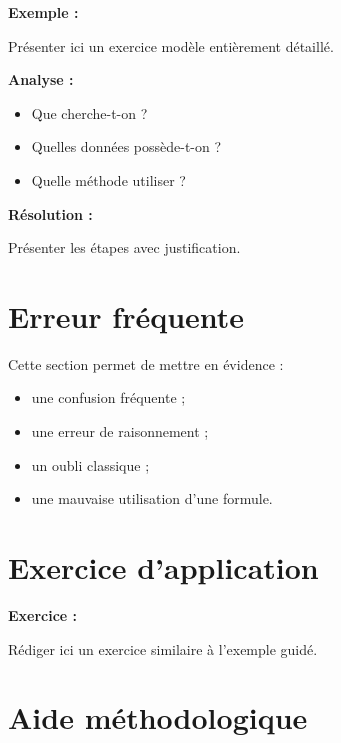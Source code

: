 \documentclass[11pt,a4paper]{article}
\begin{document}
\begin{cadreexemple}
\textbf{Exemple :}

\medskip

Présenter ici un exercice modèle entièrement détaillé.

\medskip

\textbf{Analyse :}
\begin{itemize}
    \item Que cherche-t-on ?
    \item Quelles données possède-t-on ?
    \item Quelle méthode utiliser ?
\end{itemize}

\medskip

\textbf{Résolution :}

Présenter les étapes avec justification.
\end{cadreexemple}

\section{Erreur fréquente}

\begin{cadreattention}
Cette section permet de mettre en évidence :
\begin{itemize}
    \item une confusion fréquente ;
    \item une erreur de raisonnement ;
    \item un oubli classique ;
    \item une mauvaise utilisation d’une formule.
\end{itemize}
\end{cadreattention}

\section{Exercice d’application}

\begin{cadreenonce}
\textbf{Exercice :}

Rédiger ici un exercice similaire à l’exemple guidé.
\end{cadreenonce}

\section{Aide méthodologique}
\end{document}
